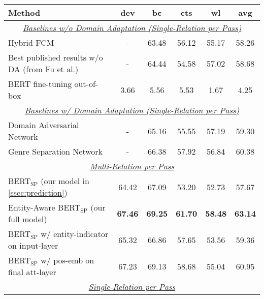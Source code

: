 \documentclass[11pt,a4paper]{article}
\begin{document}
\begin{table*}[!htbp]
\centering
\small
\begin{tabular}{lccccc}
\toprule
\textbf{Method}                                                                                           & \textbf{dev} & \textbf{bc}    & \textbf{cts}   & \textbf{wl}    & \textbf{avg}   \\ \midrule
\multicolumn{6}{c}{\underline{\emph{Baselines w/o Domain Adaptation (Single-Relation per Pass)}}} \\ 
Hybrid FCM \cite{gormley2015improved}                                                       & -            & 63.48          & 56.12          & 55.17          & 58.26          \\ 
Best published results w/o DA (from Fu et al.) & -            & 64.44          & 54.58          & 57.02          & 58.68          \\ 
BERT fine-tuning out-of-box                                                                                           & 3.66         & 5.56           & 5.53           & 1.67           & 4.25           \\ 
\midrule
\multicolumn{6}{c}{\underline{\emph{Baselines w/ Domain Adaptation (Single-Relation per Pass)}}} \\ 
Domain Adversarial Network \cite{fu2017domain}  &-& 65.16          & 55.55          & 57.19          & 59.30          \\ 
Genre Separation Network \cite{shi2018genre}                & -            & 66.38          & 57.92          & 56.84          & 60.38          \\ 
\midrule
\multicolumn{6}{c}{\underline{\emph{Multi-Relation per Pass}}} \\ 
BERT$_{\textrm{SP}}$ (our model in \cref{ssec:prediction}) & 64.42        & 67.09          & 53.20          & 52.73          & 57.67          \\ 
Entity-Aware BERT$_{\textrm{SP}}$ (our full model) & \bf 67.46        & \bf 69.25          & \bf 61.70          & \textbf{58.48} & \textbf{63.14} \\
BERT$_{\textrm{SP}}$ w/ entity-indicator on input-layer &   65.32      &      66.86     &     57.65      &     53.56      &     59.36      \\ 
BERT$_{\textrm{SP}}$ w/ pos-emb on final att-layer                           & 67.23        & 69.13          & 58.68          & 55.04          & 60.95          \\
\midrule
\multicolumn{6}{c}{\underline{\emph{Single-Relation per Pass}}} \\ 

\end{tabular}
\end{table*}
\end{document}

